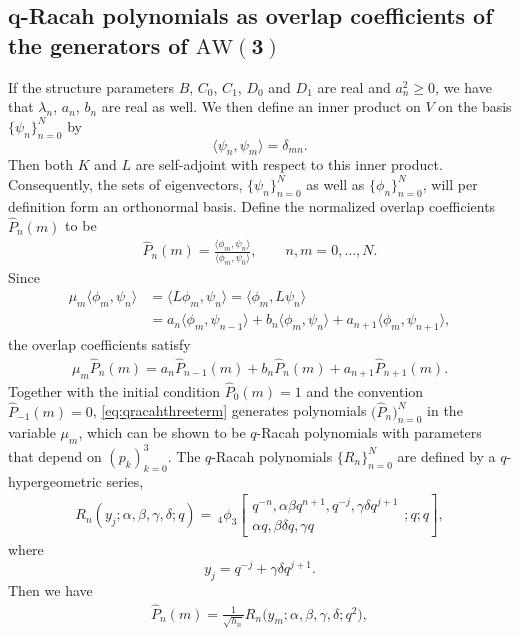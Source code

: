 \documentclass[10pt,a4paper]{amsart}
\numberwithin{equation}{section}
\newcommand{\aw}{\mathrm{AW}\!\left(3\right)}
\newcommand{\qhyp}[5]{\,_{#1}\phi_{#2} \left[ \begin{matrix}
		#3 \\ #4 \end{matrix};#5 \right]}
\begin{document}
\subsection[q-Racah polynomials as overlap coefficients of the generators of AW(3)]{$\boldsymbol{q}$-Racah polynomials as overlap coefficients of the generators of $\boldsymbol{\aw}$} \label{ssec:q-Racah pol}
If the structure parameters $B$, $C_0$, $C_1$, $D_0$ and $D_1$ are real and $a_n^2\geq 0$, we have that $\lambda_n$, $a_n$, $b_n$ are real as well. We then define an inner product on $V$ on the basis $\{\psi_n\}_{n=0}^N$ by
\[
\langle \psi_n,\psi_m\rangle=\delta_{mn}.
\]
Then both $K$ and $L$ are self-adjoint with respect to this inner product. Consequently, the sets of eigenvectors, $\{\psi_n\}_{n=0}^N$ as well as $\{\phi_n\}_{n=0}^N$, will per definition form an orthonormal basis. Define the normalized overlap coefficients $\widehat{P}_n(m)$ to be
\begin{align*}
	\widehat{P}_n(m)=\frac{\langle\phi_m,\psi_n\rangle}{\langle\phi_m,\psi_0\rangle},\qquad n,m=0,\ldots,N.
\end{align*}
Since
\begin{align}
\mu_m\langle\phi_m,\psi_n\rangle & =\langle L\phi_m, \psi_n\rangle =\langle \phi_m, L\psi_n\rangle\nonumber\\
		&=a_n\langle \phi_m,\psi_{n-1}\rangle+b_n\langle \phi_m,\psi_{n}\rangle+a_{n+1}\langle \phi_m,\psi_{n+1}\rangle, \label{eq:origin3term}
\end{align}
the overlap coefficients satisfy
\begin{gather}
	\mu_m \widehat{P}_{n}(m)= a_n \widehat{P}_{n-1}(m) + b_n \widehat{P}_{n}(m) + a_{n+1}\widehat{P}_{n+1}(m).\label{eq:qracahthreeterm}
\end{gather}
Together with the initial condition $\widehat{P}_0(m)=1$ and the convention $\widehat{P}_{-1}(m)=0$, \eqref{eq:qracahthreeterm} generates polynomials $\big(\widehat{P}_n\big)_{n=0}^N$ in the variable $\mu_m$, which can be shown \cite{Zhedanov1991} to be $q$-Racah polynomials with parameters that depend on $(p_k)_{k=0}^3$. The $q$-Racah polynomials $\{R_n\}_{n=0}^N$ are defined \cite{KLS} by a $q$-hypergeometric series,
\begin{gather}
	R_n(y_j;\alpha,\beta,\gamma,\delta;q)=\qhyp{4}{3}{q^{-n},\alpha\beta q^{n+1},q^{-j},\gamma\delta q^{j+1}}{\alpha q,\beta\delta q,\gamma q}{q;q}, \label{eq:defqracah}
\end{gather}
where
\[
y_j=q^{-j}+\gamma\delta q^{j+1}.
\]	
Then we have
\begin{gather}
	\widehat{P}_n(m)= \frac{1}{\sqrt{h_n}} R_n\big(y_m;\alpha,\beta,\gamma,\delta;q^2\big),\label{eq:overlapqracah1}
\end{gather}
\end{document}
